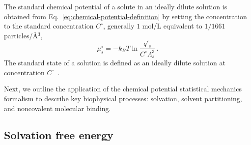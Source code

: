 \documentclass[9pt,bestpractices]{livecoms}
\begin{document}
The standard chemical potential of a solute in an ideally dilute solution is obtained from Eq.~\ref{eq:chemical-potential-definition} by setting the concentration to the standard concentration $C^\circ$, generally $1$ mol/L equivalent to $1/1661$ particles/\AA$^{3}$, 
\begin{equation}
  \mu_s^\circ = -k_B T \ln \frac{q'_s}{C^\circ \Lambda_s^3} \, .
  \label{eq:chemical-potential-standard}
\end{equation}
The standard state of a solution is defined as an ideally dilute solution at concentration $C^\circ$~\cite{levine2009physicalchemistrybook6ed}.

Next, we outline the application of the chemical potential statistical mechanics formalism to describe key biophysical processes: solvation, solvent partitioning, and noncovalent molecular binding.


\subsection{Solvation free energy}\label{sec:theory-solvation}
\end{document}
